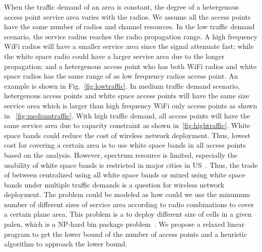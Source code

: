 When the traffic demand of an area is constant, the degree of a hetergenous access point service area 
varies with the radios. We assume all the access points have the same number of radios and channel 
resources.
In the low traffic demand scenario, the service radius reaches the radio propagation range.
A high frequency WiFi radios will have a smaller service area since the signal attenuate fast; while the white
space radio could have a larger service area due to the longer propagation; and a hetergenous access point who has
both WiFi radios and white space radios has the same range of as low frequency radios access point. An example is
shown in Fig.~\ref{fig:lowtraffic}.
In medium traffic demand scenario, hetergenous access points and white space access points will 
have the same size service area which is larger than high frequency WiFi only access points as shown in 
~\ref{fig:mediumtraffic}.
With high traffic demand, all access points will have the same service area due to capacity constraint 
as shown in~\ref{fig:hightraffic}. White space bands could reduce the cost of wireless network deployment. 
Thus, lowest cost for covering a certain area is to use white space bands in all access points 
based on the analysis. However, spectrum resource is limited, especially the usability
of white space bands is restricted in major cities in US~\cite{msdatabase}. 
Thus, the trade of between centralized using all white space bands or mixed using white space
bands under multiple traffic demands is a question for wireless network deployment. The problem
could be modeled as how could we use the minumum number of different sizes of service area according to 
radio combinations to cover a certain plane area. This problem is a to deploy different size of cells in 
a given palen, which is a NP-hard bin package problem~\cite{martello1998exact}. We propose a relaxed 
linear program to get the lower bound of the number of access points and a heuristic algorithm to 
approach the lower bound.



